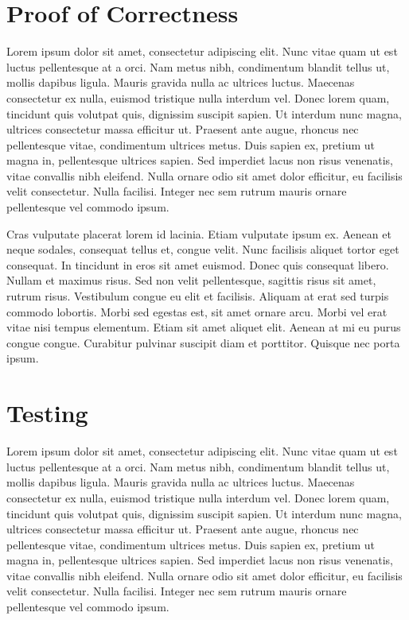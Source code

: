 \documentclass[11pt]{scrreprt}
\begin{document}
\chapter{Proof of Correctness}

Lorem ipsum dolor sit amet, consectetur adipiscing elit. Nunc vitae quam ut est luctus pellentesque at a orci. Nam metus nibh, condimentum blandit tellus ut, mollis dapibus ligula. Mauris gravida nulla ac ultrices luctus. Maecenas consectetur ex nulla, euismod tristique nulla interdum vel. Donec lorem quam, tincidunt quis volutpat quis, dignissim suscipit sapien. Ut interdum nunc magna, ultrices consectetur massa efficitur ut. Praesent ante augue, rhoncus nec pellentesque vitae, condimentum ultrices metus. Duis sapien ex, pretium ut magna in, pellentesque ultrices sapien. Sed imperdiet lacus non risus venenatis, vitae convallis nibh eleifend. Nulla ornare odio sit amet dolor efficitur, eu facilisis velit consectetur. Nulla facilisi. Integer nec sem rutrum mauris ornare pellentesque vel commodo ipsum.

Cras vulputate placerat lorem id lacinia. Etiam vulputate ipsum ex. Aenean et neque sodales, consequat tellus et, congue velit. Nunc facilisis aliquet tortor eget consequat. In tincidunt in eros sit amet euismod. Donec quis consequat libero. Nullam et maximus risus. Sed non velit pellentesque, sagittis risus sit amet, rutrum risus. Vestibulum congue eu elit et facilisis. Aliquam at erat sed turpis commodo lobortis. Morbi sed egestas est, sit amet ornare arcu. Morbi vel erat vitae nisi tempus elementum. Etiam sit amet aliquet elit. Aenean at mi eu purus congue congue. Curabitur pulvinar suscipit diam et porttitor. Quisque nec porta ipsum. 


\chapter{Testing}

Lorem ipsum dolor sit amet, consectetur adipiscing elit. Nunc vitae quam ut est luctus pellentesque at a orci. Nam metus nibh, condimentum blandit tellus ut, mollis dapibus ligula. Mauris gravida nulla ac ultrices luctus. Maecenas consectetur ex nulla, euismod tristique nulla interdum vel. Donec lorem quam, tincidunt quis volutpat quis, dignissim suscipit sapien. Ut interdum nunc magna, ultrices consectetur massa efficitur ut. Praesent ante augue, rhoncus nec pellentesque vitae, condimentum ultrices metus. Duis sapien ex, pretium ut magna in, pellentesque ultrices sapien. Sed imperdiet lacus non risus venenatis, vitae convallis nibh eleifend. Nulla ornare odio sit amet dolor efficitur, eu facilisis velit consectetur. Nulla facilisi. Integer nec sem rutrum mauris ornare pellentesque vel commodo ipsum.
\end{document}

